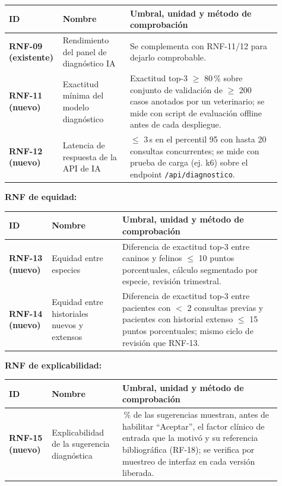 \begin{longtable}{@{}>{\bfseries}p{0.13\linewidth} >{\raggedright\arraybackslash}p{0.24\linewidth} >{\raggedright\arraybackslash}p{0.54\linewidth}@{}}
\toprule
\textbf{ID} & \textbf{Nombre} & \textbf{Umbral, unidad y método de comprobación} \\
\midrule
\endhead
\bottomrule
\endlastfoot
RNF-09 (existente) & Rendimiento del panel de diagnóstico IA & Se complementa con RNF-11/12 para dejarlo comprobable. \\
RNF-11 (nuevo) & Exactitud mínima del modelo diagnóstico & Exactitud top-3 $\geq$ 80\,\% sobre conjunto de validación de $\geq$ 200 casos anotados por un veterinario; se mide con script de evaluación offline antes de cada despliegue. \\
RNF-12 (nuevo) & Latencia de respuesta de la API de IA & $\leq$ 3\,s en el percentil 95 con hasta 20 consultas concurrentes; se mide con prueba de carga (ej. k6) sobre el endpoint \texttt{/api/diagnostico}. \\
\end{longtable}

\textbf{RNF de equidad:}

\begin{longtable}{@{}>{\bfseries}p{0.13\linewidth} >{\raggedright\arraybackslash}p{0.24\linewidth} >{\raggedright\arraybackslash}p{0.54\linewidth}@{}}
\toprule
\textbf{ID} & \textbf{Nombre} & \textbf{Umbral, unidad y método de comprobación} \\
\midrule
\endhead
\bottomrule
\endlastfoot
RNF-13 (nuevo) & Equidad entre especies & Diferencia de exactitud top-3 entre caninos y felinos $\leq$ 10 puntos porcentuales, cálculo segmentado por especie, revisión trimestral. \\
RNF-14 (nuevo) & Equidad entre historiales nuevos y extensos & Diferencia de exactitud top-3 entre pacientes con $<$ 2 consultas previas y pacientes con historial extenso $\leq$ 15 puntos porcentuales; mismo ciclo de revisión que RNF-13. \\
\end{longtable}

\textbf{RNF de explicabilidad:}

\begin{longtable}{@{}>{\bfseries}p{0.13\linewidth} >{\raggedright\arraybackslash}p{0.24\linewidth} >{\raggedright\arraybackslash}p{0.54\linewidth}@{}}
\toprule
\textbf{ID} & \textbf{Nombre} & \textbf{Umbral, unidad y método de comprobación} \\
\midrule
\endhead
\bottomrule
\endlastfoot
RNF-15 (nuevo) & Explicabilidad de la sugerencia diagnóstica & 100\,\% de las sugerencias muestran, antes de habilitar ``Aceptar'', el factor clínico de entrada que la motivó y su referencia bibliográfica (RF-18); se verifica por muestreo de interfaz en cada versión liberada. \\
\end{longtable}

